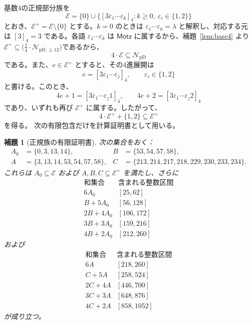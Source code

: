 \documentclass[12pt]{ltjsarticle}
\theoremstyle{plain}
\newtheorem{lemma}[theorem]{補題}
\theoremstyle{definition}
\theoremstyle{plain}
\newcommand{\val}[2]{[#1]_{#2}}
\newcommand{\NpD}{\mathcal{N}_{\mathrm{pD}}}
\newcommand{\Pset}{%
  \bigl(\tfrac{1}{4}\cdot\mathcal{N}_{\mathrm{pD},\geq 12}\bigr)%
}
\begin{document}
基数4の正規部分族を
\[
 \mathcal E=\{0\}\cup
 \bigl\{\val{3\varepsilon_1\cdots\varepsilon_k}{4}:
        k\geq0,\ \varepsilon_i\in\{1,2\}\bigr\}
\]
とおき、$\mathcal E^+=\mathcal E\setminus\{0\}$ とする。$k=0$ のときは
$\varepsilon_1\cdots\varepsilon_k=\lambda$ と解釈し、対応する元は
$[3]_4=3$ である。各語 $\varepsilon_1\cdots\varepsilon_k$ は
$\mathsf{Motz}$ に属するから、補題~\ref{lem:base4} より$ \mathcal E^+\subseteq\Pset$であるから、
\begin{equation}\label{eq:4E}
 4\cdot\mathcal E\subseteq\NpD
\end{equation}
である。また、$e\in\mathcal E^+$ とすると、その4進展開は
\[
 e=[3\varepsilon_1\cdots\varepsilon_j]_4,
 \qquad \varepsilon_i\in\{1,2\}
\]
と書ける。このとき、
\[
 4e+1=[3\varepsilon_1\cdots\varepsilon_j1]_4,
 \qquad
 4e+2=[3\varepsilon_1\cdots\varepsilon_j2]_4
\]
であり、いずれも再び $\mathcal E^+$ に属する。したがって、
\begin{equation}\label{eq:Eclosure}
 4\cdot\mathcal E^++\{1,2\}\subseteq\mathcal E^+
\end{equation}
を得る。
次の有限包含だけを計算証明書として用いる。

\begin{lemma}[正規族の有限証明書]\label{lem:Ecertificate}
次の集合をおく：
\[
\begin{aligned}
 A_0&=\{0,3,13,14\},
 &B&=\{53,54,57,58\},\\
 A&=\{3,13,14,53,54,57,58\},
 &C&=\{213,214,217,218,229,230,233,234\}.
\end{aligned}
\]
これらは $A_0\subseteq\mathcal E$ および
$A,B,C\subseteq\mathcal E^+$ を満たし、さらに
\begin{equation}\label{eq:E-small-certificate}
\begin{array}{c|c}
\text{和集合}&\text{含まれる整数区間}\\ \hline
6A_0 &[25,62]\\
B+5A_0 &[56,128]\\
2B+4A_0 &[106,172]\\
3B+3A_0 &[159,216]\\
4B+2A_0 &[212,260]
\end{array}
\end{equation}
および
\begin{equation}\label{eq:E-tail-certificate}
\begin{array}{c|c}
\text{和集合}&\text{含まれる整数区間}\\ \hline
6A &[218,260]\\
C+5A &[258,524]\\
2C+4A &[446,700]\\
3C+3A &[648,876]\\
4C+2A &[858,1052]
\end{array}
\end{equation}
が成り立つ。
\end{lemma}
\end{document}
